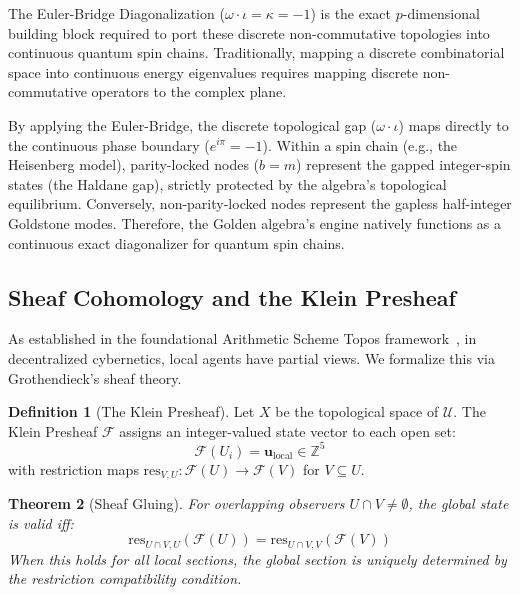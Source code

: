 \documentclass[12pt,oneside]{article}
\theoremstyle{principia}
\newtheorem{theorem}{Theorem}[section]
\theoremstyle{definition}
\newtheorem{definition}[theorem]{Definition}
\theoremstyle{remark}
\providecommand{\ZZ}{\mathbb{Z}}
\begin{document}
The Euler-Bridge Diagonalization ($\omega \cdot \iota = \kappa = -1$) is the exact $p$-dimensional building block required to port these discrete non-commutative topologies into continuous quantum spin chains. Traditionally, mapping a discrete combinatorial space into continuous energy eigenvalues requires mapping discrete non-commutative operators to the complex plane. 

By applying the Euler-Bridge, the discrete topological gap ($\omega \cdot \iota$) maps directly to the continuous phase boundary ($e^{i\pi} = -1$). Within a spin chain (e.g., the Heisenberg model), parity-locked nodes ($b=m$) represent the gapped integer-spin states (the Haldane gap), strictly protected by the algebra's topological equilibrium. Conversely, non-parity-locked nodes represent the gapless half-integer Goldstone modes. Therefore, the Golden algebra's engine natively functions as a continuous exact diagonalizer for quantum spin chains.

\subsection{Sheaf Cohomology and the Klein Presheaf}

As established in the foundational Arithmetic Scheme Topos framework~\cite{larue_lc}, in decentralized cybernetics, local agents have partial views. We formalize this via Grothendieck's sheaf theory.

\begin{definition}[The Klein Presheaf]\label{def:presheaf}
Let $X$ be the topological space of $\mathcal{U}$. The Klein Presheaf $\mathcal{F}$ assigns an integer-valued state vector to each open set:
$$\mathcal{F}(U_i) = \mathbf{u}_{\text{local}} \in \ZZ^5$$
with restriction maps $\mathrm{res}_{V,U}: \mathcal{F}(U) \to \mathcal{F}(V)$ for $V \subseteq U$.
\end{definition}

\begin{theorem}[Sheaf Gluing]\label{thm:gluing}
For overlapping observers $U \cap V \neq \emptyset$, the global state is valid iff:
$$\mathrm{res}_{U \cap V, U}(\mathcal{F}(U)) = \mathrm{res}_{U \cap V, V}(\mathcal{F}(V))$$
When this holds for all local sections, the global section is uniquely determined by the restriction compatibility condition.
\end{theorem}
\end{document}
